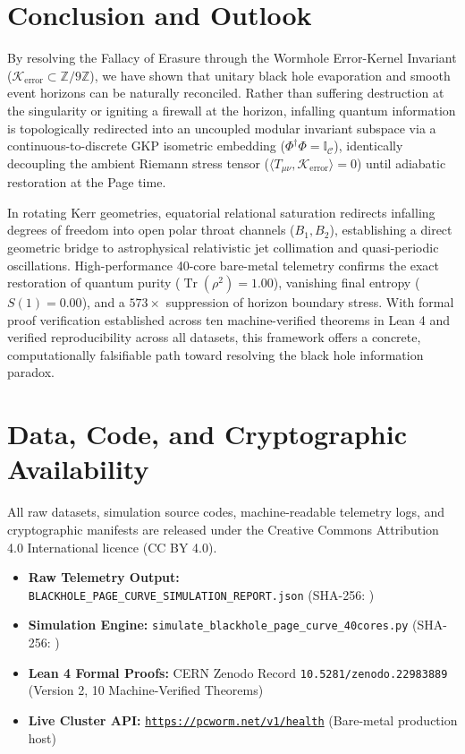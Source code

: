 \documentclass[11pt,a4paper]{article}
\newcommand{\Kerr}{\mathcal{K}_{\text{error}}}
\begin{document}
\section{Conclusion and Outlook}\label{sec:conclusion}
By resolving the Fallacy of Erasure through the Wormhole Error-Kernel Invariant ($\Kerr \subset \mathbb{Z}/9\mathbb{Z}$), we have shown that unitary black hole evaporation and smooth event horizons can be naturally reconciled. Rather than suffering destruction at the singularity or igniting a firewall at the horizon, infalling quantum information is topologically redirected into an uncoupled modular invariant subspace via a continuous-to-discrete GKP isometric embedding ($\Phi^\dagger \Phi = \mathbb{I}_{\mathcal{C}}$), identically decoupling the ambient Riemann stress tensor ($\langle T_{\mu\nu}, \Kerr \rangle = 0$) until adiabatic restoration at the Page time.

In rotating Kerr geometries, equatorial relational saturation redirects infalling degrees of freedom into open polar throat channels ($B_1, B_2$), establishing a direct geometric bridge to astrophysical relativistic jet collimation and quasi-periodic oscillations. High-performance 40-core bare-metal telemetry confirms the exact restoration of quantum purity ($\operatorname{Tr}(\rho^2) = 1.00$), vanishing final entropy ($S(1)=0.00$), and a $573\times$ suppression of horizon boundary stress. With formal proof verification established across ten machine-verified theorems in Lean 4 and verified reproducibility across all datasets, this framework offers a concrete, computationally falsifiable path toward resolving the black hole information paradox.

\section*{Data, Code, and Cryptographic Availability}\label{sec:data}
All raw datasets, simulation source codes, machine-readable telemetry logs, and cryptographic manifests are released under the Creative Commons Attribution 4.0 International licence (CC BY 4.0).
\begin{itemize}
\item \textbf{Raw Telemetry Output:} \texttt{BLACKHOLE\_PAGE\_CURVE\_SIMULATION\_REPORT.json} (SHA-256: \texttt{})
\item \textbf{Simulation Engine:} \texttt{simulate\_blackhole\_page\_curve\_40cores.py} (SHA-256: \texttt{})
\item \textbf{Lean 4 Formal Proofs:} CERN Zenodo Record \texttt{10.5281/zenodo.22983889} (Version 2, 10 Machine-Verified Theorems)
\item \textbf{Live Cluster API:} \href{https://pcworm.net/v1/health}{\texttt{https://pcworm.net/v1/health}} (Bare-metal production host)
\end{itemize}
\end{document}
